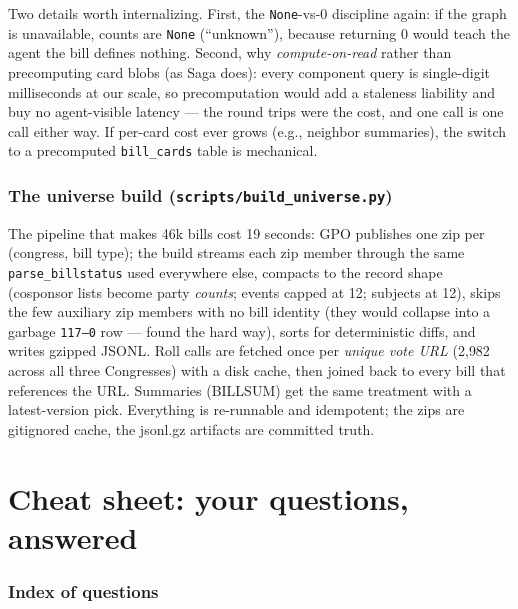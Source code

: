 \documentclass[11pt]{article}
\newcommand{\file}[1]{\texttt{#1}}
\newcommand{\code}[1]{\texttt{#1}}
\begin{document}
Two details worth internalizing. First, the \code{None}-vs-0 discipline
again: if the graph is unavailable, counts are \code{None} (``unknown''),
because returning 0 would teach the agent the bill defines nothing. Second,
why \emph{compute-on-read} rather than precomputing card blobs (as Saga
does): every component query is single-digit milliseconds at our scale, so
precomputation would add a staleness liability and buy no agent-visible
latency --- the round trips were the cost, and one call is one call either
way. If per-card cost ever grows (e.g., neighbor summaries), the switch to a
precomputed \code{bill\_cards} table is mechanical.

\section{The universe build (\file{scripts/build\_universe.py})}
\label{sec:universecode}

The pipeline that makes 46k bills cost 19 seconds: GPO publishes one zip per
(congress, bill type); the build streams each zip member through the same
\code{parse\_billstatus} used everywhere else, compacts to the record shape
(cosponsor lists become party \emph{counts}; events capped at 12; subjects at
12), skips the few auxiliary zip members with no bill identity (they would
collapse into a garbage \code{117--0} row --- found the hard way), sorts for
deterministic diffs, and writes gzipped JSONL. Roll calls are fetched once
per \emph{unique vote URL} (2{,}982 across all three Congresses) with a disk
cache, then joined back to every bill that references the URL. Summaries
(BILLSUM) get the same treatment with a latest-version pick. Everything is
re-runnable and idempotent; the zips are gitignored cache, the jsonl.gz
artifacts are committed truth.

\part{Cheat sheet: your questions, answered}

\section{Index of questions}
\label{sec:cheat}
\end{document}
